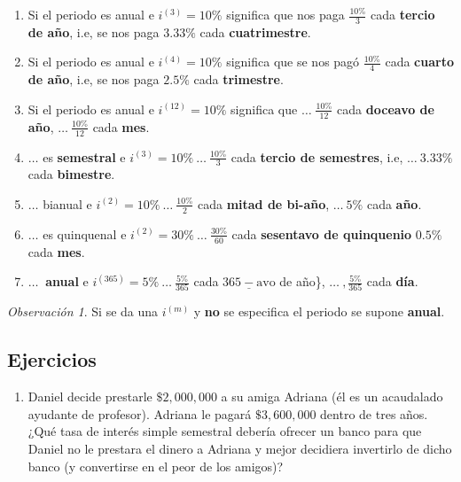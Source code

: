 \documentclass[
]{book}
\providecommand{\tightlist}{%
  \setlength{\itemsep}{0pt}\setlength{\parskip}{0pt}}
\theoremstyle{definition}
\theoremstyle{definition}
\theoremstyle{definition}
\theoremstyle{definition}
\theoremstyle{remark}
\newtheorem*{remark}{Observación }
\begin{document}
\begin{enumerate}
\def\labelenumi{\arabic{enumi}.}
\item
  Si el periodo es anual e \(i^{(3)} = 10\%\) significa que nos paga \(\frac{10\%}{3}\) cada \textbf{tercio de año}, i.e, se nos paga \(3.33\%\) cada \textbf{cuatrimestre}.
\item
  Si el periodo es anual e \(i^{(4)} = 10\%\) significa que se nos pagó \(\frac{10\%}{4}\) cada \textbf{cuarto de año}, i.e, se nos paga \(2.5\%\) cada \textbf{trimestre}.
\item
  Si el periodo es anual e \(i^{(12)} = 10\%\) significa que \(\ldots\; \frac{10\%}{12}\) cada \textbf{doceavo de año}, \(\ldots \: \frac{10\%}{12}\) cada \textbf{mes}.
\item
  \(\ldots\) es \textbf{semestral} e \(i^{(3)} = 10\% \: \ldots \: \frac{10\%}{3}\) cada \textbf{tercio de semestres}, i.e, \(\ldots \: 3.33\%\) cada \textbf{bimestre}.
\item
  \(\ldots\) bianual e \(i^{(2)} = 10\% \: \ldots \: \frac{10\%}{2}\) cada \textbf{mitad de bi-año}, \(\ldots \: 5\%\) cada \textbf{año}.
\item
  \(\ldots\) es quinquenal e \(i^{(2)} = 30\% \: \ldots \: \frac{30\%}{60}\) cada \textbf{sesentavo de quinquenio} \(0.5\%\) cada \textbf{mes}.
\item
  \(\ldots \:\) \textbf{anual} e \(i^{(365)} = 5\% \: \ldots \: \frac{5\%}{365}\) cada \(\underline{365-\text{avo}}\) de año\}, \(\ldots\:, \frac{5\%}{365}\) cada \textbf{día}.
\end{enumerate}

\begin{remark}
Si se da una \(i^{(m)}\) y \textbf{no} se especifica el periodo se supone \textbf{anual}.
\end{remark}

\hypertarget{ejercicios}{%
\subsection{Ejercicios}\label{ejercicios}}

\begin{enumerate}
\def\labelenumi{\arabic{enumi}.}
\setcounter{enumi}{11}
\tightlist
\item
  Daniel decide prestarle \(\$2,000,000\) a su amiga Adriana (él es un acaudalado ayudante de profesor). Adriana le pagará \(\$3,600,000\) dentro de tres años. ¿Qué tasa de interés simple semestral debería ofrecer un banco para que Daniel no le prestara el dinero a Adriana y mejor decidiera invertirlo de dicho banco (y convertirse en el peor de los amigos)?
\end{enumerate}
\end{document}
